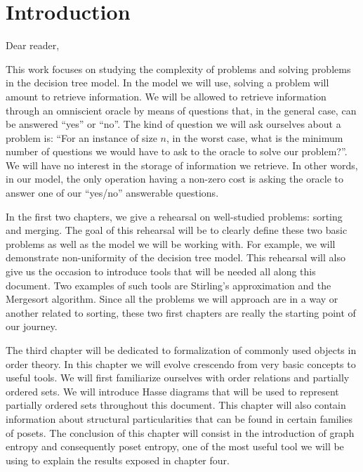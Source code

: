 \setcounter{chapter}{-1}
\chapter{Introduction}

Dear reader,

This work focuses on studying the complexity of problems and solving problems
in the decision tree model. In the model we will use, solving a problem will
amount to retrieve information. We will be allowed to retrieve information
through an omniscient oracle by means of questions that, in the general case,
can be answered ``yes'' or ``no''. The kind of question we will ask ourselves
about a problem is: ``For an instance of size \(n\), in the worst case, what is
the minimum number of questions we would have to ask to the oracle to solve our
problem?''. We will have no interest in the storage of information we retrieve.
In other words, in our model, the only operation having a non-zero cost is
asking the oracle to answer one of our ``yes/no'' answerable questions.

In the first two chapters, we give a rehearsal on well-studied problems:
sorting and merging. The goal of this rehearsal will be to clearly define these
two basic problems as well as the model we will be working with. For example,
we will demonstrate non-uniformity of the decision tree model. This rehearsal
will also give us the occasion to introduce tools that will be needed all along
this document. Two examples of such tools are Stirling's approximation and the
Mergesort algorithm.  Since all the problems we will approach are in a way or
another related to sorting, these two first chapters are really the starting
point of our journey.

The third chapter will be dedicated to formalization of commonly used objects
in order theory. In this chapter we will evolve crescendo from very basic
concepts to useful tools. We will first familiarize ourselves with order
relations and partially ordered sets. We will introduce Hasse diagrams that
will be used to represent partially ordered sets throughout this document.
This chapter will also contain information about structural particularities
that can be found in certain families of posets. The conclusion of this
chapter will consist in the introduction of graph entropy and consequently
poset entropy, one of the most useful tool we will be using to explain the
results exposed in chapter four.


